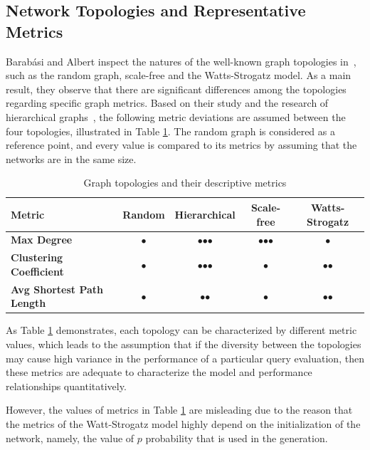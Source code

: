 \subsection{Network Topologies and Representative Metrics} \label{sec:topology_metric}

Barabási and Albert inspect the natures of the well-known graph topologies in~\cite{statistical_mechanics}, such as the random graph, scale-free and the Watts-Strogatz model. As a main result, they observe that there are significant differences among the topologies regarding specific graph metrics. Based on their study and the research of hierarchical graphs~\cite{hierarchical}, the following metric deviations are assumed between the four topologies, illustrated in Table \ref{tab:topology_metrics}. The random graph is considered as a reference point, and every value is compared to its metrics by assuming that the networks are in the same size.
\begin{table}[ht]
	\footnotesize
	\centering
	\begin{tabular}{ l c c c c}
		\toprule
		Metric & Random & Hierarchical & Scale-free & Watts-Strogatz \\ 
		\midrule 
		\textbf{Max Degree} & $\bullet$ & $\bullet$$\bullet$$\bullet$ & $\bullet$$\bullet$$\bullet$ & $\bullet$ \\ \hline
		\textbf{Clustering Coefficient} & $\bullet$ & $\bullet$$\bullet$$\bullet$ & $\bullet$ & $\bullet$$\bullet $\\ \hline
		\textbf{Avg Shortest Path Length} & $\bullet$ & $\bullet$$\bullet$ & $\bullet$ & $\bullet$$\bullet$ \\ \hline
		\bottomrule
	\end{tabular}
	\caption{Graph topologies and their descriptive metrics}
	\label{tab:topology_metrics}
\end{table}
As Table \ref{tab:topology_metrics} demonstrates, each topology can be characterized by different metric values, which leads to the assumption that if the diversity between the topologies may cause high variance in the performance of a particular query evaluation, then these metrics are adequate to characterize the model and performance relationships quantitatively.


However, the values of metrics in Table \ref{tab:topology_metrics} are misleading due to the reason that the metrics of the Watt-Strogatz model highly depend on the initialization of the network, namely, the value of $p$ probability that is used in the generation.

